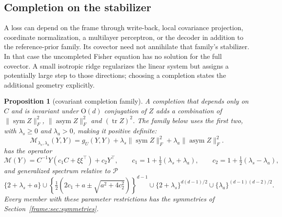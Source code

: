 \documentclass[11pt]{article}
\newtheorem{proposition}[theorem]{Proposition}
\theoremstyle{definition}
\theoremstyle{remark}
\providecommand{\tr}{\operatorname{tr}}
\providecommand{\sym}{\operatorname{sym}}
\providecommand{\asym}{\operatorname{asym}}
\begin{document}
\subsection{Completion on the stabilizer}\label{frame:sec:completion}

A loss can depend on the frame through write-back, local covariance projection, coordinate normalization, a multilayer perceptron, or the decoder in addition to the reference-prior family. Its covector need not annihilate that family's stabilizer. In that case the uncompleted Fisher equation has no solution for the full covector. A small isotropic ridge regularizes the linear system but assigns a potentially large step to those directions; choosing a completion states the additional geometry explicitly.

\begin{proposition}[covariant completion family]\label{frame:prop:completion}
A completion that depends only on $C$ and is invariant under $\mathrm{O}(d)$ conjugation of $Z$ adds a combination of $\|\sym Z\|_F^2$, $\|\asym Z\|_F^2$ and $(\tr Z)^2$. The family below uses the first two, with $\lambda_s\ge0$ and $\lambda_a>0$, making it positive definite:
\begin{equation}\label{frame:eq:completion}
\mathcal{M}_{\lambda_s,\lambda_a}(Y,Y)=g_U(Y,Y)+\lambda_s\|\sym Z\|_F^2+\lambda_a\|\asym Z\|_F^2.
\end{equation}
has the operator
\begin{equation}\label{frame:eq:M}
\mathcal{M}(Y)=C^{-1}Y(c_1C+\xi\xi^\top)+c_2Y^\top,\qquad c_1=1+\tfrac12(\lambda_s+\lambda_a),\qquad c_2=1+\tfrac12(\lambda_s-\lambda_a),
\end{equation}
and generalized spectrum relative to $\mathcal{P}$
\begin{equation}\label{frame:eq:M-spectrum}
\{2+\lambda_s+a\}\cup\left\{\tfrac12\left(2c_1+a\pm\sqrt{a^2+4c_2^2}\right)\right\}^{d-1}\cup\{2+\lambda_s\}^{d(d-1)/2}\cup\{\lambda_a\}^{(d-1)(d-2)/2}.
\end{equation}
Every member with these parameter restrictions has the symmetries of Section~\ref{frame:sec:symmetries}.
\end{proposition}
\end{document}

